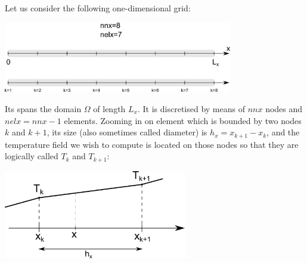 
Let us consider the following one-dimensional grid: 
\begin{center}
\includegraphics[width=10cm]{images/oneD/domain}
\end{center}
Its spans the domain $\Omega$ of length $L_x$. 
It is discretised by means of 
$nnx$ nodes and $nelx=nnx-1$ elements.
Zooming in on element which is bounded by two nodes $k$ and $k+1$,
its size (also sometimes called diameter) is $h_x=x_{k+1}-x_k$, 
and the temperature field we wish to compute is located on those 
nodes so that they are logically called $T_k$ and $T_{k+1}$:

\begin{center}
\includegraphics[width=8cm]{images/oneD/el1D}
\end{center}

